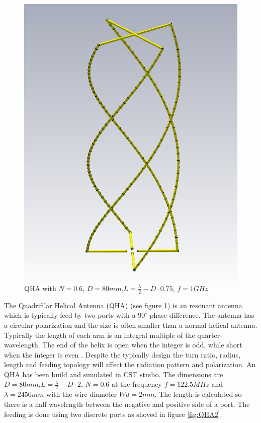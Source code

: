 \begin{figure}[H]
\centering 
\includegraphics[scale = 0.7]{figures/antennas/qha/qha_6_1mhz}
\caption{QHA with $N=0.6$, $D=80mm$,$L=\frac{\lambda}{2}-D\cdot 0.75$, $f=1GHz$}
\label{fig:QHA1}
\end{figure}

The Quadrifilar Helical Antenna (QHA) (see figure \ref{fig:QHA1}) is an resonant antenna which is typically feed by two ports with a $90^\circ$ phase difference. The antenna has a circular polarization and the size is often smaller than a normal helical antenna. Typically the length of each arm is an integral multiple of the quarter-wavelength. The end of the helix
is open when the integer is odd, while short when the integer is
even \citep{Bai2014}. Despite the typically design the turn ratio, radius, length and feeding topology will affect the radiation pattern and polarization. 
\newline
\newline
An QHA has been build and simulated in CST studio. The dimensions are $D=80mm$,$L=\frac{\lambda}{2}-D\cdot 2$, $N=0.6$ at the frequency $f=122.5MHz$ and $\lambda = 2450mm$ with the wire diameter $Wd = 2mm$. The length is calculated so there is a half wavelength between the negative and positive side of a port. The feeding is done using two discrete ports as shoved in figure \ref{fig:QHA2}.  

